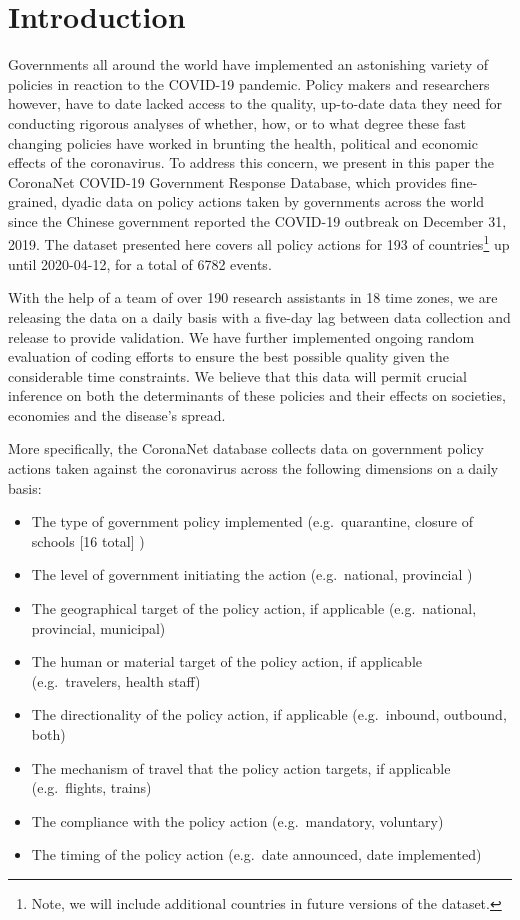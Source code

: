 \documentclass[]{article}
\providecommand{\tightlist}{%
  \setlength{\itemsep}{0pt}\setlength{\parskip}{0pt}}
\let\rmarkdownfootnote\footnote%
\def\footnote{\protect\rmarkdownfootnote}
\begin{document}
\hypertarget{introduction}{%
\section{Introduction}\label{introduction}}

Governments all around the world have implemented an astonishing variety of policies in reaction to the COVID-19 pandemic. Policy makers and researchers however, have to date lacked access to the quality, up-to-date data they need for conducting rigorous analyses of whether, how, or to what degree these fast changing policies have worked in brunting the health, political and economic effects of the coronavirus. To address this concern, we present in this paper the CoronaNet COVID-19 Government Response Database, which provides fine-grained, dyadic data on policy actions taken by governments across the world since the Chinese government reported the COVID-19 outbreak on December 31, 2019. The dataset presented here covers all policy actions for 193 of countries\footnote{Note, we will include additional countries in future versions of the dataset.} up until 2020-04-12, for a total of 6782 events.

With the help of a team of over 190 research assistants in 18 time zones, we are releasing the data on a daily basis with a five-day lag between data collection and release to provide validation. We have further implemented ongoing random evaluation of coding efforts to ensure the best possible quality given the considerable time constraints. We believe that this data will permit crucial inference on both the determinants of these policies and their effects on societies, economies and the disease's spread.

More specifically, the CoronaNet database collects data on government policy actions taken against the coronavirus across the following dimensions on a daily basis:

\begin{itemize}
\tightlist
\item
  The type of government policy implemented (e.g.~quarantine, closure of schools {[}16 total{]} )
\item
  The level of government initiating the action (e.g.~national, provincial )
\item
  The geographical target of the policy action, if applicable (e.g.~national, provincial, municipal)
\item
  The human or material target of the policy action, if applicable (e.g.~travelers, health staff)
\item
  The directionality of the policy action, if applicable (e.g.~inbound, outbound, both)
\item
  The mechanism of travel that the policy action targets, if applicable (e.g.~flights, trains)
\item
  The compliance with the policy action (e.g.~mandatory, voluntary)
\item
  The timing of the policy action (e.g.~date announced, date implemented)
\end{itemize}
\end{document}
